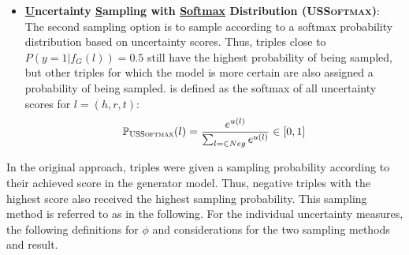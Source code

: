 \begin{itemize}
    \item
    \textbf{\underline{U}ncertainty \underline{S}ampling with \underline{Softmax} Distribution (\textsc{USSoftmax})}:\\
    
    The second sampling option is to sample according to a softmax probability distribution based on uncertainty scores.
    Thus, triples close to $P(y = 1 | f_G(l)) = 0.5$ still have the highest probability of being sampled, but other triples for which the model is more certain are also assigned a probability of being sampled.
    \ussoftmax is defined as the softmax of all uncertainty scores for $l = (h,r,t)$:
    \begin{equation}
        \label{eq:ussoftmax}
        \mathbb{P}_{\textsc{USSoftmax}}(l) = \frac{e^{u(l)}}{\sum_{l = \in Neg}{e^{u(l)}}} \in [0,1]
    \end{equation}
\end{itemize}
In the original \kbgan approach, triples were given a sampling probability according to their achieved score in the generator model.
Thus, negative triples with the highest score also received the highest sampling probability.
This sampling method is referred to as \origsampling in the following.
For the individual uncertainty measures, the following definitions for $\phi$ and considerations for the two sampling methods \usmax and \ussoftmax result.

